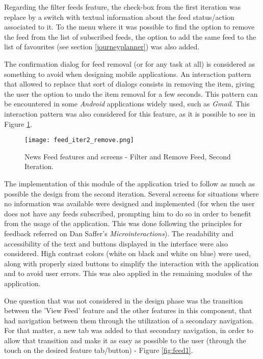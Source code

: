 Regarding the filter feeds feature, the check-box from the first iteration was replace by a switch with textual information about the feed status/action associated to it.
To the menu where it was possible to find the option to remove the feed from the list of subscribed feeds, the option to add the same feed to the list of favourites (see section \ref{journeyplanner}) was also added. 

The confirmation dialog for feed removal (or for any task at all) is considered as something to avoid when designing mobile applications. An interaction pattern that allowed to replace that sort of dialogs consists in removing the item, giving the user the option to undo the item removal for a few seconds. This pattern can be encountered in some \emph{Android} applications widely used, such as \emph{Gmail}. This interaction pattern was also considered for this feature, as it is possible to see in Figure \ref{fig:feed_iter2_remove}.

\begin{figure}[H]
  \begin{center}
    \leavevmode
    \texttt{[image: feed\_iter2\_remove.png]}
    \caption{News Feed features and screens - Filter and Remove Feed, Second Iteration.}
    \label{fig:feed_iter2_remove}
  \end{center}
\end{figure} 

The implementation of this module of the application tried to follow as much as possible the design from the second iteration. Several screens for situations where no information was available were designed and implemented (for when the user does not have any feeds subscribed, prompting him to do so in order to benefit from the usage of the application. This was done following the principles for feedback referred on Dan Saffer's \emph{Microinteractions}\cite{kn:Saf13}). The readability and accessibility of the text and buttons displayed in the interface were also considered. High contrast colors (white on black and white on blue) were used, along with properly sized buttons to simplify the interaction with the application and to avoid user errors. This was also applied in the remaining modules of the application.

One question that was not considered in the design phase was the transition between the 'View Feed' feature and the other features in this component, that had navigation between them through the utilization of a secondary navigation. For that matter, a new tab was added to that secondary navigation, in order to allow that transition and make it as easy as possible to the user (through the touch on the desired feature tab/button) - Figure \ref{fig:feed1}.

